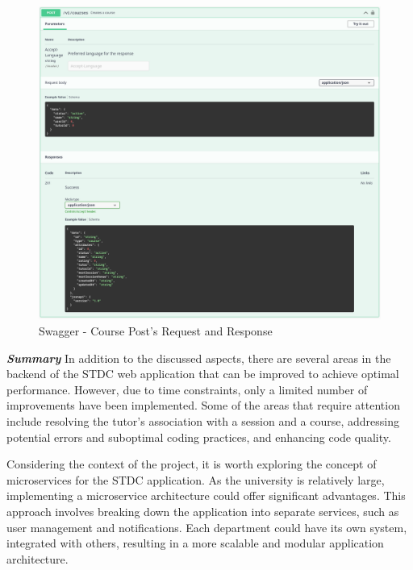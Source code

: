 \begin{justify}
        \begin{figure}[H]
            \centerline{\includegraphics[width=150mm,scale=1]{figures/implementation_and_testing/implementation/backend/response request.png}}
            \caption{Swagger - Course Post's Request and Response}
        \end{figure}
        
    \clearpage

    

    \vspace{0.25cm}
    \newendline \textbf{\textit{Summary}}\newendline
        In addition to the discussed aspects, there are several areas in the backend of the STDC web application that can be improved to achieve optimal performance. However, due to time constraints, only a limited number of improvements have been implemented. Some of the areas that require attention include resolving the tutor's association with a session and a course, addressing potential errors and suboptimal coding practices, and enhancing code quality.

        \vspace{0.25cm}
        \newendline Considering the context of the project, it is worth exploring the concept of microservices for the STDC application. As the university is relatively large, implementing a microservice architecture could offer significant advantages. This approach involves breaking down the application into separate services, such as user management and notifications. Each department could have its own system, integrated with others, resulting in a more scalable and modular application architecture.
        

\end{justify}
